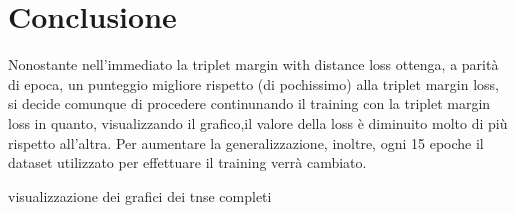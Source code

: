 \documentclass[11pt]{article}
\begin{document}
\pagebreak
\section{Conclusione}

Nonostante nell'immediato la triplet margin with distance loss ottenga, a parità di epoca, un punteggio migliore rispetto (di pochissimo)
alla triplet margin loss,
si decide comunque di procedere continunando il training con la triplet margin loss in quanto, visualizzando il grafico,il valore della loss
è diminuito molto di più rispetto all'altra.
Per aumentare la generalizzazione, inoltre, ogni 15 epoche il dataset utilizzato per effettuare il training verrà cambiato. 

\begin{center}
    visualizzazione dei grafici dei tnse completi
\end{center}
\end{document}
